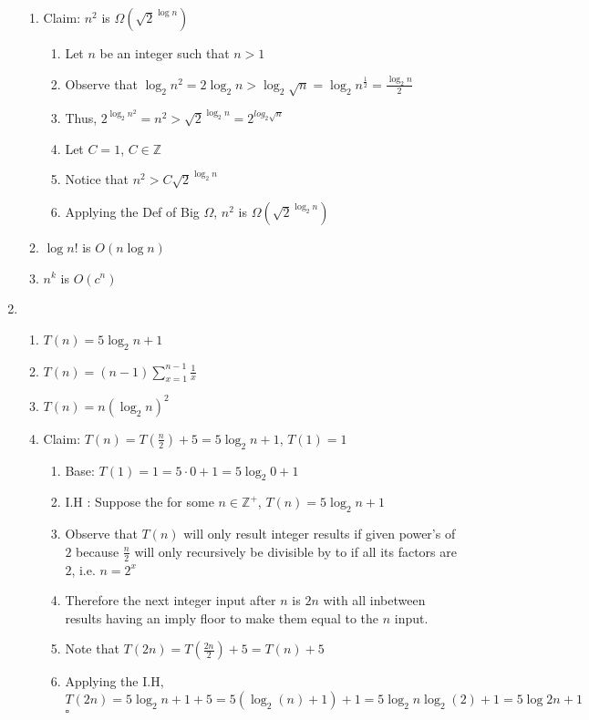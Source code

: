 \documentclass[12pt]{article}
\begin{document}
\begin{enumerate}
\begin{enumerate}
  \item Claim: $n^2$ is $\Omega(\sqrt{2}^{\log{n}})$
    \begin{enumerate}
    \item Let $n$ be an integer such that $n>1$
    \item Observe that $\log_2n^2=2\log_2n > \log_2\sqrt{n} =
      \log_2{n^{\frac{1}{2}}} = \frac{\log_2{n}}{2}$
    \item Thus, $2^{\log_2{n^2}} = n^2 > \sqrt{2}^{\log_2n}=
      2^{log_2{\sqrt{n}}} $
    \item Let $C=1$, $C \in \mathbb{Z}$
    \item Notice that $n^2 > C\sqrt{2}^{\log_2n}$
    \item Applying the Def of Big $\Omega$, $n^2$ is $\Omega{(\sqrt{2}^{\log_2{n}})}$
    \end{enumerate}
  \item $\log n!$ is $O{(n\log{n})}$
  \item $n^k$ is $O{(c^n)}$
  \end{enumerate}
\item
  \begin{enumerate}
  \item $T(n)=5\log_2{n}+1$
  \item $T(n) = (n-1)\sum_{x=1}^{n-1}\frac{1}{x}$
  \item $T(n)=n(\log_2n)^2$
  \item Claim: $T(n)=T(\frac{n}{2})+5=5\log_2{n}+1$, $T(1)=1$
    \begin{enumerate}
    \item Base: $T(1)=1=5\cdot 0 + 1=5\log_2{0} +1$
    \item I.H : Suppose the for some $n\in\mathbb{Z}^+$, $T(n)=5\log_2n+1$
    \item Observe that $T(n)$ will only result integer results if
      given power's of $2$ because $\frac{n}{2}$ will only
      recursively be divisible by to if all its factors are $2$,
      i.e. $n=2^x$
    \item Therefore the next integer input after $n$ is $2n$ with all
      inbetween results having an imply floor to make them
      equal to the $n$ input.
    \item Note that $T(2n)=T(\frac{2n}{2})+5=T(n)+5$
    \item Applying the I.H, $T(2n) = 5\log_2n+1+5= 5(\log_2{(n)}+1)+1
      = 5\log_2{n}\log_2(2)+1 = 5\log{2n}+1$\\$\square$
    \end{enumerate}
    

\end{enumerate}
\end{enumerate}
\end{document}
